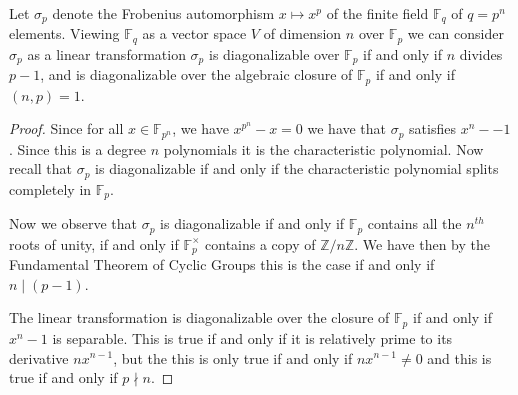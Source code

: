 \documentclass[11pt]{article}
\newenvironment{problem}[2][Problem\!]{\begin{tcolorbox}\begin{trivlist}
\item[\hskip \labelsep {\bfseries #1}\hskip \labelsep {\bfseries #2}]}{\end{trivlist}\end{tcolorbox}}
\newcommand{\zz}{\mathbb Z}   %
\newcommand{\ff}{\mathbb F}   %
\begin{document}
\vspace*{15pt}

\begin{problem}{14.5.12}
    Let $\sigma_p$ denote the Frobenius automorphism $x\mapsto x^{p}$ of the finite field $\ff_q$ of $q = p^{n}$ elements. Viewing $\ff_q$ as a vector space $V$ of dimension $n$ over $\ff_p$ we can consider $\sigma_p$ as a linear transformation $\sigma_p$ is diagonalizable over $\ff_p$ if and only if $n$ divides $p-1$, and is diagonalizable over the algebraic closure of $\ff_p$ if and only if $(n,p) = 1$.
\end{problem}
\begin{proof}
    Since for all $x\in \ff_{p^{n}}$, we have $x^{p^{n}} -x = 0$ we have that $\sigma_p$ satisfies $x^{n} --1$. Since this is a degree $n$ polynomials it is the characteristic polynomial. Now recall that $\sigma_p$ is diagonalizable if and only if the characteristic polynomial splits completely in $\ff_p$. 

    Now we observe that $\sigma_p$ is diagonalizable if and only if $\ff_p$ contains all the $n^{th}$ roots of unity, if and only if $\ff_p^{\times}$ contains a copy of $\zz/n\zz$. We have then by the Fundamental Theorem of Cyclic Groups this is the case if and only if $n\mid (p-1)$. 

    The linear transformation is diagonalizable over the closure of $\ff_p$ if and only if $x^{n}- 1$ is separable. This is true if and only if it is relatively prime to its derivative $nx^{n-1}$, but the this is only true if and only if $nx^{n-1}\neq 0$ and this is true if and only if $p \nmid n$. 
\end{proof}

\vspace*{15pt}
\end{document}
